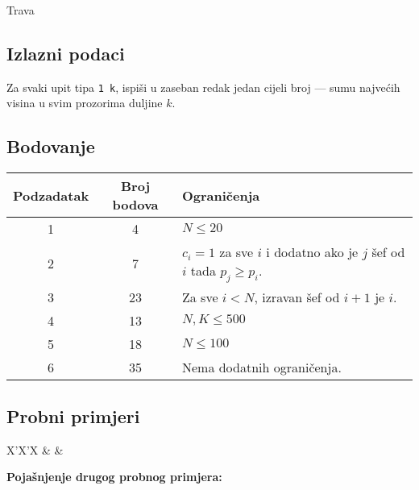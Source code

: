 \begin{statement}[
  problempoints=100,
  timelimit=1 sekunda,
  memorylimit=512 MiB,
]{Trava}
\subsection*{Izlazni podaci}

Za svaki upit tipa \texttt{1 k}, ispiši u zaseban redak jedan cijeli broj — sumu najvećih visina u svim prozorima duljine $k$.

\subsection*{Bodovanje}


{\renewcommand{\arraystretch}{1.4}
  \setlength{\tabcolsep}{6pt}
  \begin{tabular}{ccl}
   Podzadatak & Broj bodova & Ograničenja \\ \midrule
   	1 & 4 & $N \leq 20$ \\
    2 & 7 & $c_i = 1$ za sve $i$ i dodatno ako je $j$ šef od $i$ tada $p_j \geq p_i$. \\
    3 & 23 & Za sve $i < N$, izravan šef od $i + 1$ je $i$. \\
    4 & 13 & $N, K \leq 500$ \\
    5 & 18 & $N \leq 100$ \\
    6 & 35 & Nema dodatnih ograničenja. \\
\end{tabular}}

\subsection*{Probni primjeri}
\begin{tabularx}{\textwidth}{X'X'X}
 &
 &
\end{tabularx}

\pagebreak

\textbf{Pojašnjenje drugog probnog primjera:}\\


\end{statement}

